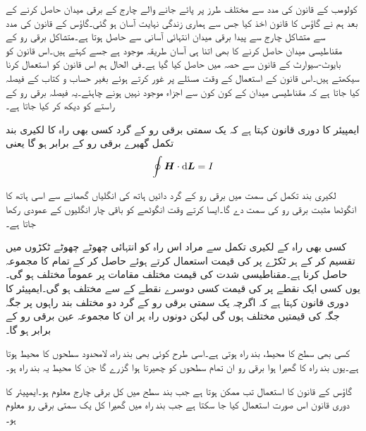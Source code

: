 کولومب کے قانون کی مدد سے مختلف طرز پر پائے جانے والے چارج کے برقی میدان حاصل کرنے کے بعد ہم نے گاؤس کا قانون اخذ کیا جس سے ہماری زندگی نہایت آسان ہو گئی۔گاؤس کے قانون کی مدد سے متشاکل چارج سے پیدا برقی میدان انتہائی آسانی سے حاصل ہوتا ہے۔متشاکل برقی رو کے مقناطیسی میدان حاصل کرنے کا بھی اتنا ہی آسان طریقہ موجود ہے جسے  کہتے ہیں۔اس قانون کو بایوٹ-سیوارٹ کے قانون سے حصہ  میں حاصل کیا گیا ہے۔فی الحال ہم اس قانون کو استعمال کرنا سیکھتے ہیں۔اس قانون کے استعمال کے وقت مسئلے پر غور کرتے ہوئے بغیر حساب و کتاب کے فیصلہ کیا جاتا ہے کہ مقناطیسی میدان کے کون کون سے اجزاء موجود نہیں ہونے چاہئے۔یہ فیصلہ برقی رو کے راستے کو دیکھ کر کیا جاتا ہے۔

ایمپیئر کا دوری قانون کہتا ہے کہ یک سمتی برقی رو کے گرد کسی بھی راہ  کا لکیری بند تکمل گھیرے برقی رو کے برابر ہو گا یعنی
\begin{align}\label{مساوات_مقناطیسی_ایمپیئر_کا_دوری_قانون}
\oint \kvec{H} \cdot \dif \kvec{L}=I
\end{align}

لکیری بند تکمل کی سمت میں برقی رو کے گرد  دائیں ہاتھ کی انگلیاں گھمانے سے اسی ہاتھ کا انگوٹھا مثبت برقی رو کی سمت دے گا۔ایسا کرتے وقت انگوٹھے کو باقی چار انگلیوں کے عمودی رکھا جاتا ہے۔

کسی بھی راہ  کے لکیری تکمل سے مراد اس راہ  کو انتہائی چھوٹے چھوٹے ٹکڑوں  میں تقسیم کر کے ہر ٹکڑے پر  کی قیمت استعمال کرتے ہوئے  حاصل کر کے تمام  کا مجموعہ حاصل کرنا ہے۔مقناطیسی شدت  کی قیمت مختلف مقامات پر عموماً مختلف ہو گی۔یوں کسی ایک نقطے پر  کی قیمت کسی دوسرے نقطے کے  سے مختلف ہو گی۔ایمپیئر کا دوری قانون کہتا ہے کہ اگرچہ یک سمتی برقی رو کے گرد دو مختلف بند راہوں پر جگہ جگہ  کی قیمتیں مختلف ہوں گی لیکن دونوں راہ پر ان کا مجموعہ عین برقی رو کے برابر ہو گا۔

کسی بھی سطح کا محیط، بند راہ ہوتی ہے۔اسی طرح کوئی بھی بند راہ، لامحدود سطحوں کا محیط ہوتا ہے۔یوں بند راہ کا گھیرا ہوا برقی رو ان تمام سطحوں کو چھیرتا ہوا گزرے گا جن کا محیط یہ بند راہ ہو۔

گاؤس کے قانون کا استعمال تب ممکن ہوتا ہے جب بند سطح میں کل برقی چارج معلوم ہو۔ایمپیئر کا دوری قانون اس صورت استعمال کیا جا سکتا ہے جب  بند راہ میں گھیرا کل یک سمتی برقی رو معلوم ہو۔   

